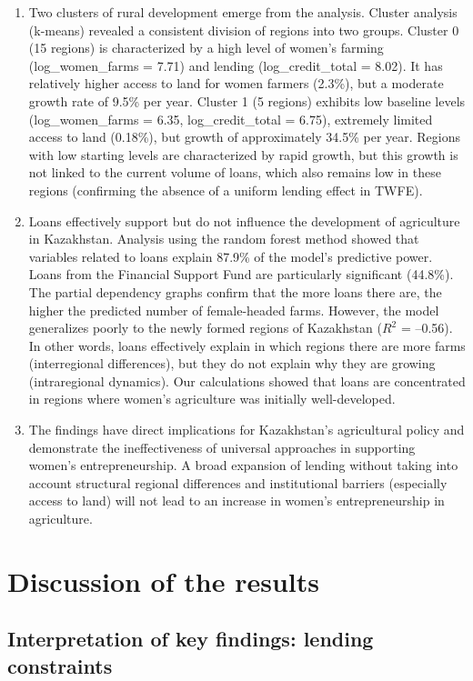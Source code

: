 \documentclass[pdflatex,sn-mathphys-ay]{sn-jnl}
\begin{document}
\begin{enumerate}
\item Two clusters of rural development emerge from the analysis.
Cluster analysis (k-means) revealed a consistent division of regions
into two groups. Cluster 0 (15 regions) is characterized by a high
level of women's farming (log\_women\_farms = 7.71) and lending
(log\_credit\_total = 8.02). It has relatively higher access to land
for women farmers (2.3\%), but a moderate growth rate of 9.5\% per
year. Cluster 1 (5 regions) exhibits low baseline levels
(log\_women\_farms = 6.35, log\_credit\_total = 6.75), extremely
limited access to land (0.18\%), but growth of approximately 34.5\% per
year. Regions with low starting levels are characterized by rapid
growth, but this growth is not linked to the current volume of loans,
which also remains low in these regions (confirming the absence of a
uniform lending effect in TWFE).

\item Loans effectively support but do not influence the development of
agriculture in Kazakhstan. Analysis using the random forest method
showed that variables related to loans explain 87.9\% of the model's
predictive power. Loans from the Financial Support Fund are particularly
significant (44.8\%). The partial dependency graphs confirm that the
more loans there are, the higher the predicted number of female-headed
farms. However, the model generalizes poorly to the newly formed regions
of Kazakhstan ($R^2$ = --0.56). In other words, loans effectively explain
in which regions there are more farms (interregional differences), but
they do not explain why they are growing (intraregional dynamics). Our
calculations showed that loans are concentrated in regions where women's
agriculture was initially well-developed.

\item The findings have direct implications for Kazakhstan's
agricultural policy and demonstrate the ineffectiveness of universal
approaches in supporting women's entrepreneurship. A broad expansion of
lending without taking into account structural regional differences and
institutional barriers (especially access to land) will not lead to an
increase in women's entrepreneurship in agriculture.
\end{enumerate}

\section{Discussion of the results}

\subsection{Interpretation of key findings: lending constraints}
\end{document}
